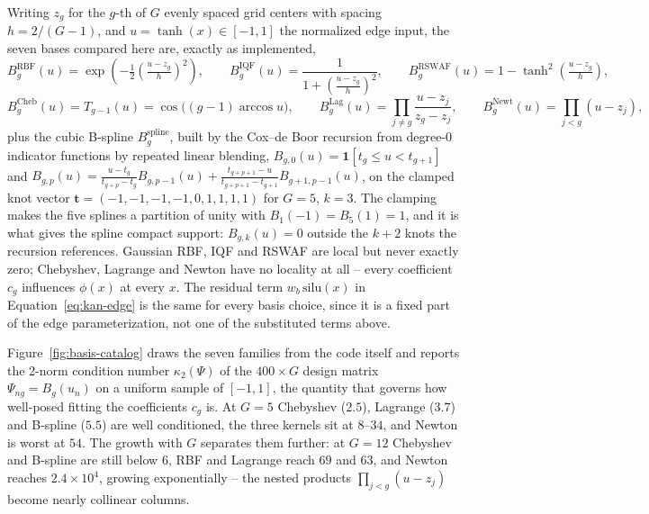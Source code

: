 Writing $z_g$ for the $g$-th of $G$ evenly spaced grid centers with spacing
$h=2/(G-1)$, and $u=\tanh(x)\in[-1,1]$ the normalized edge input, the seven
bases compared here are, exactly as implemented,
\begin{equation}
B_g^{\text{RBF}}(u)=\exp\!\left(-\tfrac12\left(\tfrac{u-z_g}{h}\right)^2\right), \qquad
B_g^{\text{IQF}}(u)=\frac{1}{1+\left(\frac{u-z_g}{h}\right)^2}, \qquad
B_g^{\text{RSWAF}}(u)=1-\tanh^2\!\left(\tfrac{u-z_g}{h}\right),
\label{eq:basis-rbf-spline}
\end{equation}
\begin{equation}
B_g^{\text{Cheb}}(u)=T_{g-1}(u)=\cos\big((g-1)\arccos u\big), \qquad
B_g^{\text{Lag}}(u)=\prod_{j\neq g}\frac{u-z_j}{z_g-z_j}, \qquad
B_g^{\text{Newt}}(u)=\prod_{j<g}(u-z_j),
\label{eq:basis-poly}
\end{equation}
plus the cubic B-spline $B_g^{\text{spline}}$, built by the Cox--de Boor
recursion from degree-0 indicator functions by repeated linear blending,
$B_{g,0}(u)=\mathbf{1}[t_g\le u<t_{g+1}]$ and
$B_{g,p}(u)=\frac{u-t_g}{t_{g+p}-t_g}B_{g,p-1}(u)+\frac{t_{g+p+1}-u}{t_{g+p+1}-t_{g+1}}B_{g+1,p-1}(u)$,
on the clamped knot vector $\mathbf{t}=(-1,-1,-1,-1,0,1,1,1,1)$ for $G=5$,
$k=3$. The clamping makes the five splines a partition of unity with
$B_1(-1)=B_5(1)=1$, and it is what gives the spline compact support:
$B_{g,k}(u)=0$ outside the $k+2$ knots the recursion references. Gaussian
RBF, IQF and RSWAF are local but never exactly zero; Chebyshev, Lagrange and
Newton have no locality at all -- every coefficient $c_g$ influences
$\phi(x)$ at every $x$. The residual term $w_b\,\mathrm{silu}(x)$ in
Equation~\ref{eq:kan-edge} is the same for every basis choice, since it is a
fixed part of the edge parameterization, not one of the substituted terms
above.

Figure~\ref{fig:basis-catalog} draws the seven families from the code
itself and reports the 2-norm condition number $\kappa_2(\Psi)$ of the
$400\times G$ design matrix $\Psi_{ng}=B_g(u_n)$ on a uniform sample of
$[-1,1]$, the quantity that governs how well-posed fitting the coefficients
$c_g$ is. At $G=5$ Chebyshev ($2.5$), Lagrange ($3.7$) and B-spline ($5.5$)
are well conditioned, the three kernels sit at $8$--$34$, and Newton is
worst at $54$. The growth with $G$ separates them further: at $G=12$
Chebyshev and B-spline are still below $6$, RBF and Lagrange reach $69$ and
$63$, and Newton reaches $2.4\times10^4$, growing exponentially -- the
nested products $\prod_{j<g}(u-z_j)$ become nearly collinear columns.

